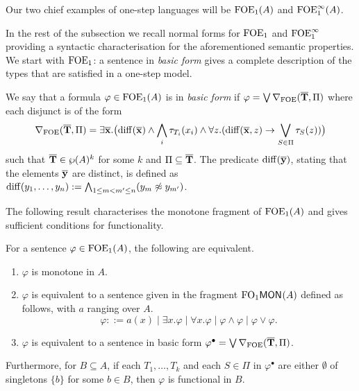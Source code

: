 Our two chief examples of one-step languages will be $\mathrm{FOE}_1(A)$ and $\mathrm{FOE}^{\infty}_1(A)$. 


In the rest of the subsection we recall normal forms for $\mathrm{FOE}_1$ and $\mathrm{FOE}^{\infty}_1$ providing a syntactic characterisation for the aforementioned semantic properties. We start with $\mathrm{FOE}_1$: a sentence in \emph{basic form} gives a complete description of the types that are satisfied in a one-step model.

\begin{definition}%
We say that a formula $\varphi \in \mathrm{FOE}_1(A)$ is in \emph{basic form} if $\varphi = \bigvee \nabla_{\mathrm{FOE}}(\overline{{\mathbf{T}}},\Pi)$ where each disjunct is of the form
%
\begin{equation*}%
\dbnfofoe{\vlist{T}}{\Pi} = \exists \vlist{x}.\big(\arediff{\vlist{x}} \land \bigwedge_i \tau_{T_i}(x_i) \land \forall z.(\arediff{\vlist{x},z} \lthen \bigvee_{S\in \Pi} \tau_S(z))\big)
\end{equation*}
%
such that $\overline{{\mathbf{T}}} \in \wp(A)^k$ for some $k$ and $\Pi \subseteq \overline{{\mathbf{T}}}$.  The predicate $\mathrm{diff}(\overline{{\mathbf{y}}})$, stating that the elements $\overline{{\mathbf{y}}}$ are distinct, is defined as $\mathrm{diff}(y_1,\dots,y_n) := \bigwedge_{1\leq m < m^{\prime} \leq n} (y_m \not\approx y_{m^{\prime}})$.
\end{definition}

The following result characterises the monotone fragment of $\mathrm{FOE}_1(A)$ and gives sufficient conditions for functionality.

\begin{theorem}\label{cor:ofoeicontinuousnf} For a sentence $\varphi \in \mathrm{FOE}_1(A)$, the following are equivalent.
\begin{enumerate}
\item $\varphi$ is monotone in $A$.
\item $\varphi$ is equivalent to a sentence given in the fragment $\mathrm{FO}_1\mathsf{MON}_{}(A)$ defined as follows, with $a$ ranging over $A$.
\[
\varphi ::= a(x) \mid \exists x.\varphi \mid \forall x.\varphi \mid \varphi \land \varphi \mid \varphi \lor \varphi.
\]
\item $\varphi$ is equivalent to a sentence in basic form $\varphi^{\bullet} = \bigvee \nabla_{\mathrm{FOE}}(\overline{{\mathbf{T}}},\Pi)$.
\end{enumerate}
Furthermore, for $B \subseteq A$, if each $T_1, \dots, T_k$ and each $S \in \Pi$ in $\varphi^{\bullet}$ are either $\emptyset$ of singletons $\{b\}$ for some $b \in B$, then $\varphi$ is functional in $B$.
\end{theorem}

